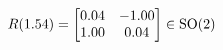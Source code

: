 \documentclass[preview]{standalone}
\begin{document}
\begin{align*}
\special{dvisvgm:raw <g id='unique000'>}R(1.54) = \begin{bmatrix} 0.04 & -1.00 \\ 1.00 & 0.04 \end{bmatrix} \in \text{SO}(2)\special{dvisvgm:raw </g>}
\end{align*}
\end{document}
